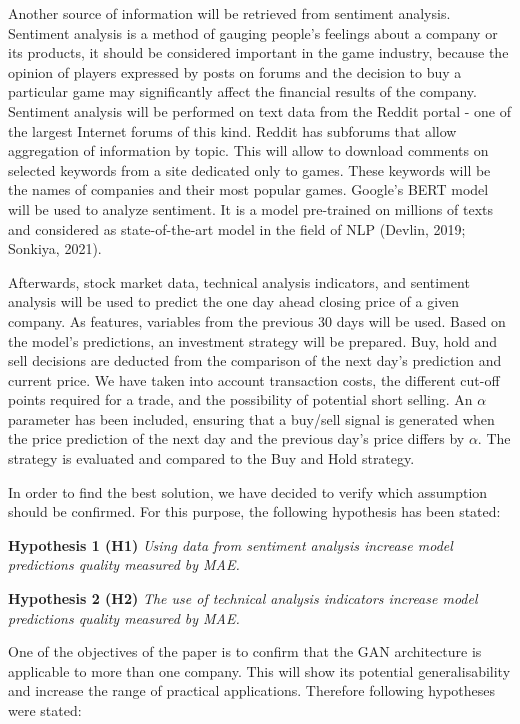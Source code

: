 \documentclass[review]{elsarticle} %
\begin{document}
Another source of information will be retrieved from sentiment analysis. Sentiment analysis is a method of gauging people's feelings about a company or its products, it should be considered important in the game industry, because the opinion of players expressed by posts on forums and the decision to buy a particular game may significantly affect the financial results of the company. Sentiment analysis will be performed on text data from the Reddit portal - one of the largest Internet forums of this kind. Reddit has subforums that allow aggregation of information by topic. This will allow to download comments on selected keywords from a site dedicated only to games. These keywords will be the names of companies and their most popular games. Google's BERT model will be used to analyze sentiment. It is a model pre-trained on millions of texts and considered as state-of-the-art model in the field of NLP (Devlin, 2019; Sonkiya, 2021). 

Afterwards, stock market data, technical analysis indicators, and sentiment analysis will be used to predict the one day ahead closing price of a given company. As features, variables from the previous 30 days will be used. Based on the model's predictions, an investment strategy will be prepared. Buy, hold and sell decisions are deducted from the comparison of the next day's prediction and current price. We have taken into account transaction costs, the different cut-off points required for a trade, and the possibility of potential short selling. An $\alpha$ parameter has been included, ensuring that a buy/sell signal is generated when the price prediction of the next day and the previous day's price differs by $\alpha$. The strategy is evaluated and compared to the Buy and Hold strategy.

In order to find the best solution, we have decided to verify which assumption should be confirmed. For this purpose, the following hypothesis has been stated: 

\textbf{Hypothesis 1 (H1)} \textit{Using data from sentiment analysis increase model predictions quality measured by MAE.}

\textbf{Hypothesis 2 (H2)} \textit{The use of technical analysis indicators increase model predictions quality measured by MAE.}

One of the objectives of the paper is to confirm that the GAN architecture is applicable to more than one company. This will show its potential generalisability and increase the range of practical applications. Therefore following hypotheses were stated:
\end{document}
